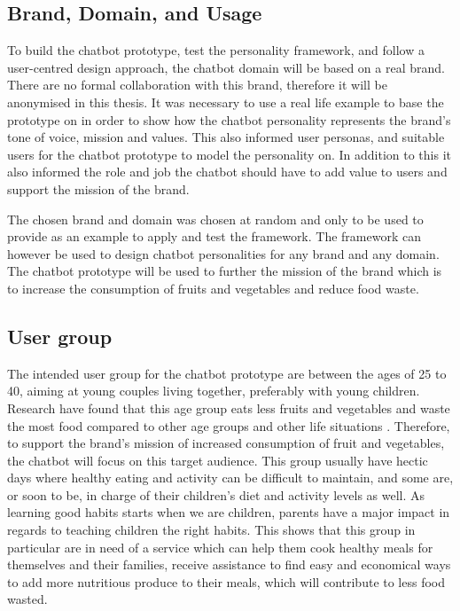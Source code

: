 \vspace{5mm} %

\subsection{Brand, Domain, and Usage}

To build the chatbot prototype, test the personality framework, and follow a user-centred design approach, the chatbot domain will be based on a real brand. There are no formal collaboration with this brand, therefore it will be anonymised in this thesis. It was necessary to use a real life example to base the prototype on in order to show how the chatbot personality represents the brand's tone of voice, mission and values. This also informed user personas, and suitable users for the chatbot prototype to model the personality on. In addition to this it also informed the role and job the chatbot should have to add value to users and support the mission of the brand.

The chosen brand and domain was chosen at random and only to be used to provide as an example to apply and test the framework. The framework can however be used to design chatbot personalities for any brand and any domain. The chatbot prototype will be used to further the mission of the brand which is to increase the consumption of fruits and vegetables and reduce food waste. 

\subsection{User group}

The intended user group for the chatbot prototype are between the ages of 25 to 40, aiming at young couples living together, preferably with young children. Research have found that this age group eats less fruits and vegetables and waste the most food compared to other age groups and other life situations \citep{forskning2011}. Therefore, to support the brand's mission of increased consumption of fruit and vegetables, the chatbot will focus on this target audience. This group usually have hectic days where healthy eating and activity can be difficult to maintain, and some are, or soon to be, in charge of their children’s diet and activity levels as well. As learning good habits starts when we are children, parents have a major impact in regards to teaching children the right habits. This shows that this group in particular are in need of a service which can help them cook healthy meals for themselves and their families, receive assistance to find easy and economical ways to add more nutritious produce to their meals, which will contribute to less food wasted.

